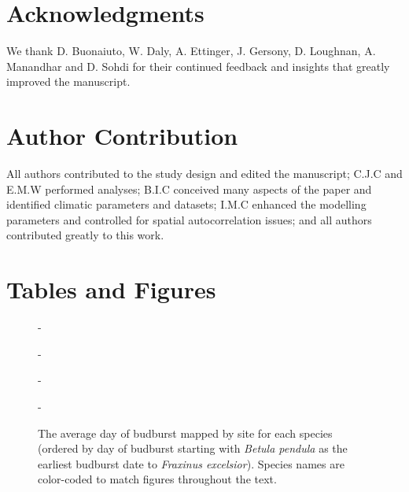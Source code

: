 \documentclass{article}\usepackage[]{graphicx}\usepackage[]{color}
\begin{document}
\section*{Acknowledgments}

We thank D. Buonaiuto, W. Daly, A. Ettinger, J. Gersony, D. Loughnan, A. Manandhar and D. Sohdi for their continued feedback and insights that greatly improved the manuscript.

\section*{Author Contribution}
All authors contributed to the study design and edited the manuscript; C.J.C and E.M.W performed analyses; B.I.C conceived many aspects of the paper and identified climatic parameters and datasets; I.M.C enhanced the modelling parameters and controlled for spatial autocorrelation issues;  and all authors contributed greatly to this work.



\section*{Tables and Figures} 

{\begin{figure} [H]
  -\begin{center}
  -\caption{The average day of budburst mapped by site for each species (ordered by day of budburst starting with \textit{Betula pendula} as the earliest budburst date to \textit{Fraxinus excelsior}). Species names are color-coded to match figures throughout the text. }\label{fig:bbmap}
  -\end{center}
  -\end{figure}}
  
\end{document}
